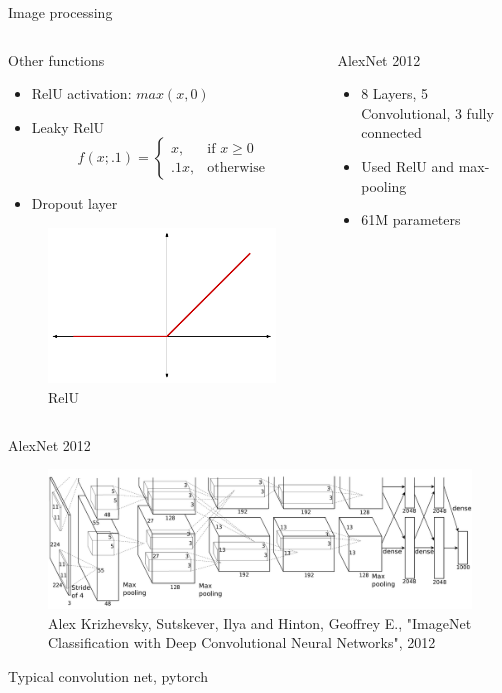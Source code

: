 \begin{frame}{Image processing}
	\begin{columns}
		\begin{column}{.5\textwidth}
			\begin{block}{Other functions}
				\begin{itemize}
					\item RelU activation: $max(x,0)$ 
					\item Leaky RelU 
					\[
					f(x;.1)= 
					\begin{cases}
					x,& \text{if } x\geq 0\\
					.1x,              & \text{otherwise}
					\end{cases}
					\] 
					\item Dropout layer 
				\end{itemize}
				\begin{figure}
					\includegraphics[width=.3\textwidth]{figures/relu}
					\caption*{\tiny{RelU}}
				\end{figure}
			\end{block}
		\end{column}
		\begin{column}{.5\textwidth}
			\begin{block}{AlexNet 2012}
				\begin{itemize}
					\item 8 Layers, 5 Convolutional, 3 fully connected
					\item Used RelU and max-pooling
					\item 61M parameters
				\end{itemize}
			\end{block}
		\end{column}
	\end{columns}

\end{frame}

\begin{frame}{AlexNet 2012}
	\begin{figure}
		\includegraphics[width=.9\textwidth, center]{figures/alexnet-arch}
		\caption*{Alex Krizhevsky, Sutskever, Ilya and Hinton, Geoffrey E., "ImageNet Classification with Deep Convolutional Neural Networks", 2012 }
	\end{figure}
\end{frame}
\begin{frame}{Typical convolution net, pytorch}
	
\end{frame}


